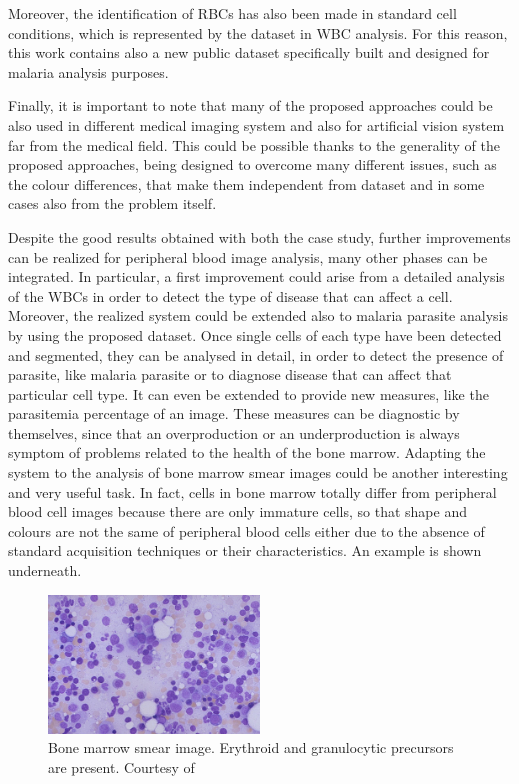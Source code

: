 \documentclass[final,a4paper,12pt,english]{UnicaPhdThesis3}
\begin{document}
Moreover, the identification of RBCs has also been made in standard cell conditions, which is represented by the dataset in WBC analysis. For this reason, this work contains also a new public dataset specifically built and designed for malaria analysis purposes.

Finally, it is important to note that many of the proposed approaches could be also used in different medical imaging system and also for artificial vision system far from the medical field. This could be possible thanks to the generality of the proposed approaches, being designed to overcome many different issues, such as the colour differences, that make them independent from dataset and in some cases also from the problem itself.

Despite the good results obtained with both the case study, further improvements can be realized for peripheral blood image analysis, many other phases can be integrated. 
In particular, a first improvement could arise from a detailed analysis of the WBCs in order to detect the type of disease that can affect a cell. 
Moreover, the realized system could be extended also to malaria parasite analysis by using the proposed dataset. Once single cells of each type have been detected and segmented, they can be analysed in detail, in order to detect the presence of parasite, like malaria parasite or to diagnose disease that can affect that particular cell type.   
It can even be extended to provide new measures, like the parasitemia percentage of an image.
These measures can be diagnostic by themselves, since that an overproduction or an underproduction is always symptom of problems related to the health of the bone marrow. Adapting the system to the analysis of bone marrow smear images could be another interesting and very useful task. In fact, cells in bone marrow totally differ from peripheral blood cell images because there are only immature cells, so that shape and colours are not the same of peripheral blood cells either due to the absence of standard acquisition techniques or their characteristics. An example is shown underneath.

\begin{figure}[b]
	\centering
	\includegraphics[width=0.5\textwidth]{images/bone_marrow}
	\caption{\label{fig:bone_marrow} Bone marrow smear image. Erythroid and granulocytic precursors are present. Courtesy of \cite{Med_Utah}}
\end{figure}
\end{document}
